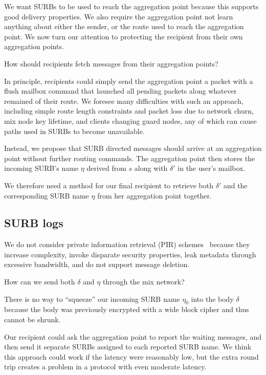We want SURBs to be used to reach the aggregation point because
this supports good delivery properties.  We also require the
aggregation point not learn anything about either the sender, or
the route used to reach the aggregation point.  We now turn our
attention to protecting the recipient from their own aggregation
points.

\begin{issue}
How should recipients fetch messages from their aggregation points?
\end{issue}

In principle, recipients could simply send the aggregation point
a packet with a flush mailbox command that launched all pending
packets along whatever remained of their route.  We foresee many
difficulties with such an approach, including simple route length
constraints and packet loss due to network churn, mix node key
lifetime, and clients changing guard nodes, any of which can cause
paths used in SURBs to become unavailable.

Instead, we propose that SURB directed messages should arrive at
an aggregation point without further routing commands.
The aggregation point then stores the incoming SURB's name $\eta$
derived from $s$ along with $\delta'$ in the user's mailbox.

We therefore need a method for our final recipient to retrieve both
$\delta'$ and the corresponding SURB name $\eta$ from her aggregation
point together. 

\subsection{SURB logs}\label{subsec:surb_logs}

We do not consider private information retrieval (PIR)
schemes~\cite{pir} because they increase complexity, invoke disparate
security properties, leak metadata through excessive bandwidth, and do
not support message deletion.

\begin{issue}
How can we send both $\delta$ and $\eta$ through the mix network?
\end{issue}

There is no way to ``squeeze'' our incoming SURB name $\eta_0$ into
the body $\delta$ because the body was previously encrypted with a
wide block cipher and thus cannot be shrunk.

Our recipient could ask the aggregation point to report the waiting
messages, and then send it separate SURBs assigned to each reported
SURB name.  We think this approach could work if the latency were
reasonably low, but the extra round trip creates a problem in a
protocol with even moderate latency. 


